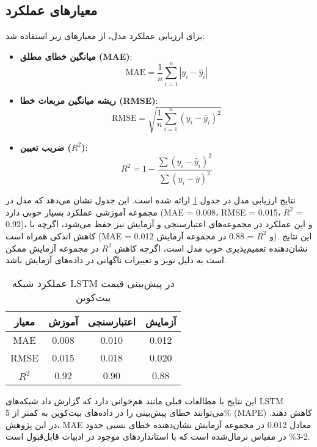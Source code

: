 \subsection{معیارهای عملکرد}
برای ارزیابی عملکرد مدل، از معیارهای زیر استفاده شد:
\begin{itemize}
	\item \textbf{میانگین خطای مطلق (MAE)}:
	\begin{equation}
		\text{MAE} = \frac{1}{n} \sum_{i=1}^n |y_i - \hat{y}_i|
	\end{equation}
	\item \textbf{ریشه میانگین مربعات خطا (RMSE)}:
	\begin{equation}
		\text{RMSE} = \sqrt{\frac{1}{n} \sum_{i=1}^n (y_i - \hat{y}_i)^2}
	\end{equation}
	\item \textbf{ضریب تعیین (\(R^2\))}:
	\begin{equation}
		R^2 = 1 - \frac{\sum (y_i - \hat{y}_i)^2}{\sum (y_i - \bar{y})^2}
	\end{equation}
\end{itemize}

نتایج ارزیابی مدل در جدول \ref{tab:lstm_performance} ارائه شده است. این جدول نشان می‌دهد که مدل در مجموعه آموزشی عملکرد بسیار خوبی دارد (MAE = 0.008، RMSE = 0.015، \(R^2\) = 0.92)، و این عملکرد در مجموعه‌های اعتبارسنجی و آزمایش نیز حفظ می‌شود، اگرچه با کاهش اندکی همراه است (MAE = 0.012 و \(R^2\) = 0.88 در مجموعه آزمایش). این نتایج نشان‌دهنده تعمیم‌پذیری خوب مدل است، اگرچه کاهش \(R^2\) در مجموعه آزمایش ممکن است به دلیل نویز و تغییرات ناگهانی در داده‌های آزمایش باشد.

\begin{table}[H]
	\centering
	\begin{tabular}{|c|c|c|c|}
		\hline
		\textbf{معیار} & \textbf{آموزش} & \textbf{اعتبارسنجی} & \textbf{آزمایش} \\
		\hline
		MAE & 0.008 & 0.010 & 0.012 \\
		RMSE & 0.015 & 0.018 & 0.020 \\
		\(R^2\) & 0.92 & 0.90 & 0.88 \\
		\hline
	\end{tabular}
	\caption{عملکرد شبکه LSTM در پیش‌بینی قیمت بیت‌کوین}
	\label{tab:lstm_performance}
\end{table}

این نتایج با مطالعات قبلی مانند \cite{hsu2018predicting} هم‌خوانی دارد که گزارش داد شبکه‌های LSTM می‌توانند خطای پیش‌بینی را در داده‌های بیت‌کوین به کمتر از 5\% (MAPE) کاهش دهند. در این پژوهش، MAE معادل 0.012 در مجموعه آزمایش نشان‌دهنده خطای نسبی حدود 2-3\% در مقیاس نرمال‌شده است که با استانداردهای موجود در ادبیات قابل‌قبول است.

